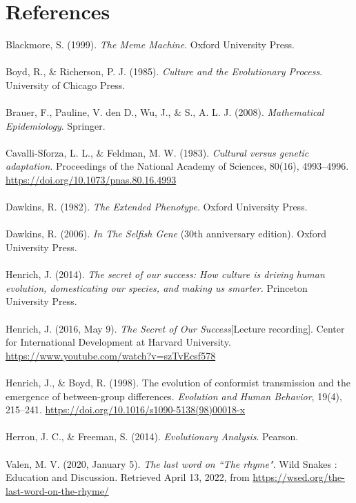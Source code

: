 \documentclass[a4paper,8pt]{extarticle}
\begin{document}
\section{References}
Blackmore, S. (1999). \emph{The Meme Machine}. Oxford University Press. 
\\\\
Boyd, R., \& Richerson, P. J. (1985). \emph{Culture and the Evolutionary Process}. University of Chicago Press. 
\\\\
Brauer, F., Pauline, V. den D., Wu, J., \& S., A. L. J. (2008). \emph{Mathematical Epidemiology}. Springer. 
\\\\
Cavalli-Sforza, L. L., \& Feldman, M. W. (1983). \emph{Cultural versus genetic adaptation}. Proceedings of the National Academy of Sciences, 80(16), 4993–4996. \href{https://doi.org/10.1073/pnas.80.16.4993}{https://doi.org/10.1073/pnas.80.16.4993}
\\\\
Dawkins, R. (1982). \emph{The Extended Phenotype}. Oxford University Press. 
\\\\
Dawkins, R. (2006). \emph{In The Selfish Gene} (30th anniversary edition). Oxford University Press. 
\\\\
Henrich, J. (2014). \emph{The secret of our success: How culture is driving human evolution, domesticating our species, and making us smarter.} Princeton University Press. 
\\\\
Henrich, J. (2016, May 9). \emph{The Secret of Our Success}[Lecture recording]. Center for International Development at Harvard University. \href{https://www.youtube.com/watch?v=szTvEcsf578}{https://www.youtube.com/watch?v=szTvEcsf578}
\\\\
Henrich, J., \& Boyd, R. (1998). The evolution of conformist transmission and the emergence of between-group differences. \emph{Evolution and Human Behavior}, 19(4), 215–241. \href{https://doi.org/10.1016/s1090-5138(98)00018-x}{https://doi.org/10.1016/s1090-5138(98)00018-x}
\\\\
Herron, J. C., \& Freeman, S. (2014). \emph{Evolutionary Analysis}. Pearson. 
\\\\
Valen, M. V. (2020, January 5). \emph{The last word on ``The rhyme"}. Wild Snakes : Education and Discussion. Retrieved April 13, 2022, from \href{https://wsed.org/the-last-word-on-the-rhyme/}{https://wsed.org/the-last-word-on-the-rhyme/}
\end{document}
